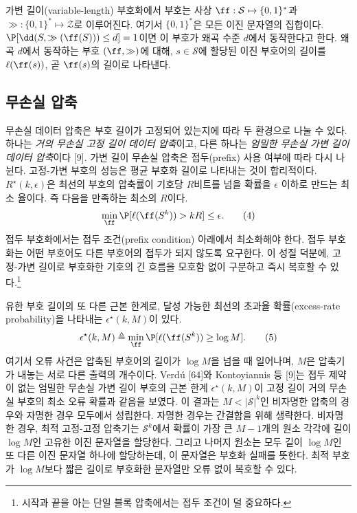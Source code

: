 가변 길이(variable-length) 부호화에서 부호는 사상 $\ff:\mathcal{S}\mapsto\{0,1\}^*$과 $\gg:\{0,1\}^*\mapsto\mathcal{Z}$로 이루어진다. 여기서 $\{0,1\}^*$은 모든 이진 문자열의 집합이다. $\P[\dd(S,\gg(\ff(S)))\le d]=1$이면 이 부호가 왜곡 수준 $d$에서 동작한다고 한다. 왜곡 $d$에서 동작하는 부호 $(\ff,\gg)$에 대해, $s\in\mathcal{S}$에 할당된 이진 부호어의 길이를 $\ell(\ff(s))$, 곧 $\ff(s)$의 길이로 나타낸다.

\subsection{무손실 압축}

무손실 데이터 압축은 부호 길이가 고정되어 있는지에 따라 두 환경으로 나눌 수 있다. 하나는 \emph{거의 무손실 고정 길이 데이터 압축}이고, 다른 하나는 \emph{엄밀한 무손실 가변 길이 데이터 압축}이다 [9]. 가변 길이 무손실 압축은 접두(prefix) 사용 여부에 따라 다시 나뉜다. 고정-가변 부호의 성능은 평균 부호화 길이로 나타내는 것이 합리적이다. $R^\star(k,\epsilon)$은 최선의 부호의 압축률이 기호당 $R$비트를 넘을 확률을 $\epsilon$ 이하로 만드는 최소 율이다. 즉 다음을 만족하는 최소의 $R$이다.
\begin{equation}
\min_{\ff}\P[\ell(\ff(S^k))>kR]\le\epsilon. \tag{4}
\end{equation}
접두 부호화에서는 접두 조건(prefix condition) 아래에서 최소화해야 한다. 접두 부호화는 어떤 부호어도 다른 부호어의 접두가 되지 않도록 요구한다. 이 성질 덕분에, 고정-가변 길이로 부호화한 기호의 긴 흐름을 모호함 없이 구분하고 즉시 복호할 수 있다.\footnote{시작과 끝을 아는 단일 블록 압축에서는 접두 조건이 덜 중요하다.}

유한 부호 길이의 또 다른 근본 한계로, 달성 가능한 최선의 초과율 확률(excess-rate probability)을 나타내는 $\epsilon^\star(k,M)$이 있다.
\begin{equation}
\epsilon^\star(k,M)\triangleq\min_{\ff}\P[\ell(\ff(S^k))\ge\log M]. \tag{5}
\end{equation}
여기서 오류 사건은 압축된 부호어의 길이가 $\log M$을 넘을 때 일어나며, $M$은 압축기가 내놓는 서로 다른 출력의 개수이다. Verdú [64]와 Kontoyiannis 등 [9]는 접두 제약이 없는 엄밀한 무손실 가변 길이 부호의 근본 한계 $\epsilon^\star(k,M)$이 고정 길이 거의 무손실 부호의 최소 오류 확률과 같음을 보였다. 이 결과는 $M<|\mathcal{S}|^k$인 비자명한 압축의 경우와 자명한 경우 모두에서 성립한다. 자명한 경우는 간결함을 위해 생략한다. 비자명한 경우, 최적 고정-고정 압축기는 $\mathcal{S}^k$에서 확률이 가장 큰 $M-1$개의 원소 각각에 길이 $\log M$인 고유한 이진 문자열을 할당한다. 그리고 나머지 원소는 모두 길이 $\log M$인 또 다른 이진 문자열 하나에 할당하는데, 이 문자열은 부호화 실패를 뜻한다. 최적 부호가 $\log M$보다 짧은 길이로 부호화한 문자열만 오류 없이 복호할 수 있다.


